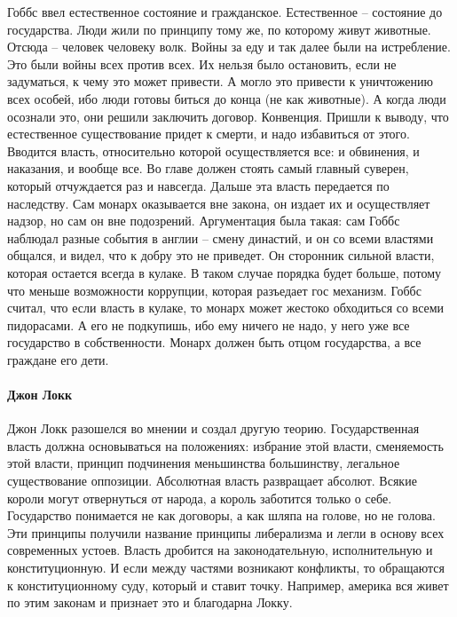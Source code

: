 \documentclass[a4paper, 12pt]{article}
\begin{document}
Гоббс ввел естественное состояние и гражданское. Естественное -- состояние до государства. Люди жили по принципу тому же, по которому живут животные. Отсюда -- человек человеку волк. Войны за еду и так далее были на истребление. Это были войны всех против всех. Их нельзя было остановить, если не задуматься, к чему это может привести. А могло это привести к уничтожению всех особей, ибо люди готовы биться до конца (не как животные). А когда люди осознали это, они решили заключить договор. Конвенция. Пришли к выводу, что естественное существование придет к смерти, и надо избавиться от этого. Вводится власть, относительно которой осуществляется все: и обвинения, и наказания, и вообще все. Во главе должен стоять самый главный суверен, который отчуждается раз и навсегда. Дальше эта власть передается по наследству. Сам монарх оказывается вне закона, он издает их и осуществляет надзор, но сам он вне подозрений. Аргументация была такая: сам Гоббс наблюдал разные события в англии -- смену династий, и он со всеми властями общался, и видел, что к добру это не приведет. Он сторонник сильной власти, которая остается всегда в кулаке. В таком случае порядка будет больше, потому что меньше возможности коррупции, которая разъедает гос механизм. Гоббс считал, что если власть в кулаке, то монарх может жестоко обходиться со всеми пидорасами. А его не подкупишь, ибо ему ничего не надо, у него уже все государство в собственности. Монарх должен быть отцом государства, а все граждане его дети. 

\paragraph{Джон Локк}Джон Локк разошелся во мнении и создал другую теорию. Государственная власть должна основываться на положениях: избрание этой власти, сменяемость этой власти, принцип подчинения меньшинства большинству, легальное существование оппозиции. Абсолютная власть развращает абсолют. Всякие короли могут отвернуться от народа, а король заботится только о себе. Государство понимается не как договоры, а как шляпа на голове, но не голова. Эти принципы получили название принципы либерализма и легли в основу всех современных устоев. Власть дробится на законодательную, исполнительную и конституционную. И если между частями возникают конфликты, то обращаются к конституционному суду, который и ставит точку. Например, америка вся живет по этим законам и признает это и благодарна Локку. 
\end{document}
